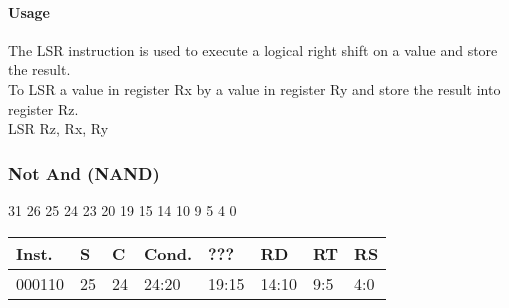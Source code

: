 \documentclass[12pt]{article}
\begin{document}
    \paragraph{Usage}
    \begin{flushleft}
    The LSR instruction is used to execute a logical right shift on a value and store the result.\\
    \vspace{1em}
    To LSR a value in register Rx by a value in register Ry and store the result into register Rz.\\
    \vspace{1em}
    LSR Rz, Rx, Ry
    \end{flushleft}
   
   




    \newpage
    \subsubsection{Not And (NAND)}
    
    \hspace{1.6cm}31 \hspace{1.2cm}26 \hspace{.075cm}25 \hspace{.15cm}24 \hspace{.075cm}23 \hspace{.875cm}20 \hspace{.04cm}19 \hspace{.8cm}15 \hspace{.04cm}14 \hspace{.8cm}10 \hspace{.04cm}9 \hspace{1.15cm}5 \hspace{.04cm}4 \hspace{1.25cm}0
    \vspace{-.25cm}
    \begin{center}
        \begin{tabular}{ |p{1.8cm}|p{.3cm}|p{.3cm}|p{1.5cm}|p{1.5cm}|p{1.5cm}|p{1.5cm}|p{1.5cm}| }
            \hline
            \textbf{Inst.} & \textbf{S}& \textbf{C} & \textbf{Cond.} & ??? & \textbf{RD} & \textbf{RT} & \textbf{RS}\\
            \hline
            000110& 25 & 24 & 24:20 & 19:15 & 14:10 & 9:5 & 4:0\\
            \hline
        \end{tabular}
    \end{center}
    
\end{document}

